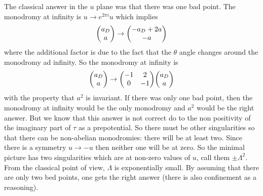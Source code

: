 \documentclass[11pt]{article}
\theoremstyle{definition}
\numberwithin{equation}{section}
\begin{document}
The classical answer in the $u$ plane was that there was one bad point. The monodromy at infinity is $u\rightarrow e^{2\pi i}u$ which implies
\begin{equation}
	\mqty(a_{D}\\a)\rightarrow \mqty(-a_{D}+2a\\-a)
\end{equation}
where the additional factor is due to the fact that the $\theta$ angle changes around the monodromy ad infinity. So the monodromy at infinity is
\begin{equation}
	\mqty(a_{D}\\a)\rightarrow \mqty(-1&2\\0&-1)\mqty(a_{D}\\a)
\end{equation}
with the property that $a^{2}$ is invariant. If there was only one bad point, then the monodromy at infinity would be the only monodromy and $a^{2}$ would be the right answer. But we know that this answer is not correct do to the non positivity of the imaginary part of $\tau$ as a prepotential. So there must be other singularities so that there can be non-abelian monodromies: there will be at least two. Since there is a symmetry $u\rightarrow-u$ then neither one will be at zero. So the minimal picture has two singularities which are at non-zero values of $u$, call them $\pm\Lambda^{2}$. From the classical point of view, $\Lambda$ is exponentially small. By assuming that there are only two bed points, one gets the right answer (there is also confinement as a reasoning).
\end{document}
